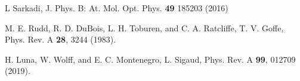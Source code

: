 \documentclass[10pt,showpacs,showkeys,twocolumn]{revtex4}
\begin{document}
\begin{thebibliography}{}
 L Sarkadi, J. Phys. B: At. Mol. Opt. Phys. \textbf{49} 185203 (2016)


 M. E. Rudd, R. D. DuBois, L. H. Toburen, and C. A. Ratcliffe, T. V. Goffe, Phys. Rev. A \textbf{28}, 3244 (1983).

 H. Luna, W. Wolff, and E. C. Montenegro, L. Sigaud, Phys. Rev. A \textbf{99}, 012709 (2019).


\end{thebibliography}
\end{document}
